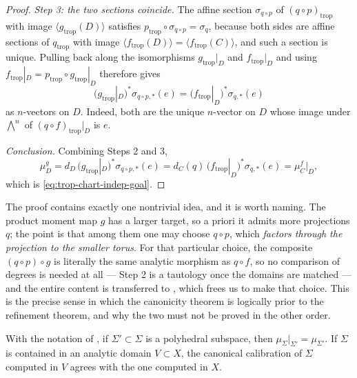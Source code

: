 \begin{proof}
\emph{Step 3: the two sections coincide.} The affine section
$\sigma_{q\circ p}$ of $(q\circ p)_{\mathrm{trop}}$ with image
$\langle g_{\mathrm{trop}}(D)\rangle$ satisfies
$p_{\mathrm{trop}}\circ\sigma_{q\circ p}=\sigma_q$, because both sides are
affine sections of $q_{\mathrm{trop}}$ with image
$\langle f_{\mathrm{trop}}(D)\rangle=\langle f_{\mathrm{trop}}(C)\rangle$,
and such a section is unique. Pulling back along the isomorphisms
$g_{\mathrm{trop}}|_D$ and $f_{\mathrm{trop}}|_D$ and using
$f_{\mathrm{trop}}|_D=p_{\mathrm{trop}}\circ g_{\mathrm{trop}}|_D$ therefore
gives
\[
 \bigl(g_{\mathrm{trop}}|_D\bigr)^*\sigma_{q\circ p,*}(e)
 =\bigl(f_{\mathrm{trop}}|_D\bigr)^*\sigma_{q,*}(e)
\]
as $n$-vectors on $D$. Indeed, both are the unique $n$-vector on $D$ whose
image under $\bigwedge^n$ of $(q\circ f)_{\mathrm{trop}}|_D$ is $e$.

\emph{Conclusion.} Combining Steps 2 and 3,
\[
 \mu^{g}_D=d_D\,\bigl(g_{\mathrm{trop}}|_D\bigr)^*\sigma_{q\circ p,*}(e)
 =d_C(q)\,\bigl(f_{\mathrm{trop}}|_D\bigr)^*\sigma_{q,*}(e)
 =\mu^{f}_C\bigl|_D,
\]
which is \eqref{eq:trop-chart-indep-goal}.
\end{proof}

\begin{remark}
\label{rem:trop-chart-indep-anatomy}
The proof contains exactly one nontrivial idea, and it is worth naming.
The product moment map $g$ has a larger target, so a priori it admits more
projections $q$; the point is that among them one may choose
$q\circ p$, which \emph{factors through the projection to the smaller
torus}. For that particular choice, the composite $(q\circ p)\circ g$ is
literally the same analytic morphism as $q\circ f$, so no comparison of
degrees is needed at all --- Step 2 is a tautology once the domains are
matched --- and the entire content is transferred to
, which frees us to make that choice.
This is the precise sense in which the canonicity theorem is logically prior
to the refinement theorem, and why the two must not be proved in the other
order.
\end{remark}

\begin{corollary}
\label{cor:trop-calibration-restriction}
With the notation of , if
$\Sigma'\subset\Sigma$ is a polyhedral subspace, then
$\mu_\Sigma|_{\Sigma'}=\mu_{\Sigma'}$. If $\Sigma$ is contained in an
analytic domain $V\subset X$, the canonical calibration of $\Sigma$ computed
in $V$ agrees with the one computed in $X$.
\end{corollary}

